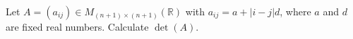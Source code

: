 Let $A=(a_{ij})\in M_{(n+1)\times (n+1)}(\mathbb{R})$ with $a_{ij}=a+|i-j|d$, where $a$ and $d$ are fixed real numbers.
Calculate $\det(A)$.